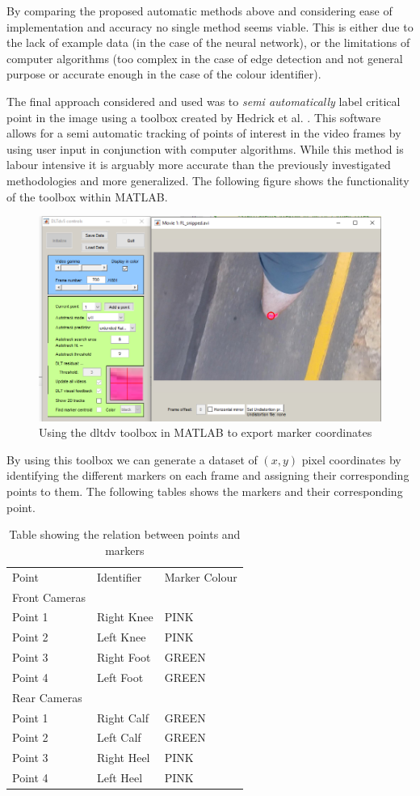 By comparing the proposed automatic methods above and considering ease of implementation and accuracy no single method seems viable. This is either due to the lack of example data (in the case of the neural network), or the limitations of computer algorithms (too complex in the case of edge detection and not general purpose or accurate enough in the case of the colour identifier).

\newpage
The final approach considered and used was to \textit{semi automatically} label critical point in the image using a toolbox created by Hedrick et al. \cite{hedrick2008software}. This software allows for a semi automatic tracking of points of interest in the video frames by using user input in conjunction with computer algorithms. While this method is labour intensive it is arguably more accurate than the previously investigated methodologies and more generalized. The following figure shows the functionality of the toolbox within MATLAB.

\begin{figure}[!ht] 
\captionsetup{width=0.8\linewidth, font=small}  
\includegraphics[width=0.5\linewidth]{figures/toolbox.png}
\caption{Using the dltdv toolbox in MATLAB to export marker coordinates}
\label{fig:toolbox}
\end{figure}

By using this toolbox we can generate a dataset of $ (x,y) $ pixel coordinates by identifying the different markers on each frame and assigning their corresponding points to them. The following tables shows the markers and their corresponding point.

\begin{table}[!ht]
\centering
\caption{Table showing the relation between points and markers}
\label{my-label}
\begin{tabular}{lll}
Point & Identifier           & Marker Colour\\
Front Cameras &            &\\
Point 1       & Right Knee &PINK \\
Point 2       & Left Knee  &PINK\\
Point 3       & Right Foot &GREEN\\
Point 4       & Left Foot  &GREEN\\
Rear Cameras  &            &\\
Point 1       & Right Calf&GREEN \\
Point 2       & Left Calf &GREEN \\
Point 3       & Right Heel&PINK \\
Point 4       & Left Heel &PINK \\
\end{tabular}
\end{table} 

